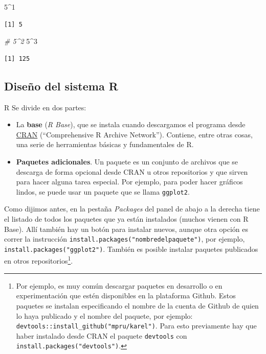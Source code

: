 \documentclass[
]{book}
\newenvironment{Shaded}{\begin{snugshade}}{\end{snugshade}}
\newcommand{\CommentTok}[1]{\textcolor[rgb]{0.56,0.35,0.01}{\textit{#1}}}
\newcommand{\DecValTok}[1]{\textcolor[rgb]{0.00,0.00,0.81}{#1}}
\newcommand{\SpecialCharTok}[1]{\textcolor[rgb]{0.00,0.00,0.00}{#1}}
\begin{document}
\begin{Shaded}
\begin{Highlighting}[]
\DecValTok{5}\SpecialCharTok{\^{}}\DecValTok{1}
\end{Highlighting}
\end{Shaded}

\begin{verbatim}
[1] 5
\end{verbatim}

\begin{Shaded}
\begin{Highlighting}[]
\CommentTok{\# 5\^{}2}
\DecValTok{5}\SpecialCharTok{\^{}}\DecValTok{3}
\end{Highlighting}
\end{Shaded}

\begin{verbatim}
[1] 125
\end{verbatim}

\hypertarget{diseuxf1o-del-sistema-r}{%
\subsection{Diseño del sistema R}\label{diseuxf1o-del-sistema-r}}

R Se divide en dos partes:

\begin{itemize}
\item
  La \textbf{base} (\emph{R Base}), que se instala cuando descargamos el programa desde \href{https://cran.r-project.org/}{CRAN} (``Comprehensive R Archive Network''). Contiene, entre otras cosas, una serie de herramientas básicas y fundamentales de R.
\item
  \textbf{Paquetes adicionales}. Un paquete es un conjunto de archivos que se descarga de forma opcional desde CRAN u otros repositorios y que sirven para hacer alguna tarea especial. Por ejemplo, para poder hacer gráficos lindos, se puede usar un paquete que se llama \texttt{ggplot2}.
\end{itemize}

Como dijimos antes, en la pestaña \emph{Packages} del panel de abajo a la derecha tiene el listado de todos los paquetes que ya están instalados (muchos vienen con R Base). Allí también hay un botón para instalar nuevos, aunque otra opción es correr la instrucción \texttt{install.packages("nombredelpaquete")}, por ejemplo, \texttt{install.packages("ggplot2")}. También es posible instalar paquetes publicados en otros repositorios\footnote{Por ejemplo, es muy común descargar paquetes en desarrollo o en experimentación que estén disponibles en la plataforma Github. Estos paquetes se instalan especificando el nombre de la cuenta de Github de quien lo haya publicado y el nombre del paquete, por ejemplo: \texttt{devtools::install\_github("mpru/karel")}. Para esto previamente hay que haber instalado desde CRAN el paquete \texttt{devtools} con \texttt{install.packages("devtools")}.}.
\end{document}
